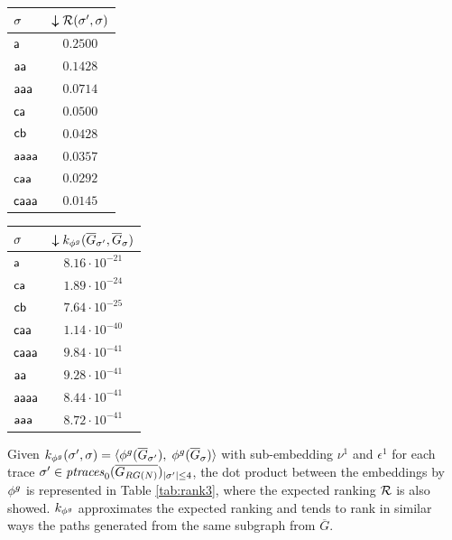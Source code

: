 \begin{table}[!t]
{\begin{tabular}{l|c}
	{$\trace$} &
	{$\boldsymbol{\downarrow}\goldenrank(\nonlogtrace,\logtrace)$} \\
	
	
	\midrule
	$\const{a}$  &  $0.2500$ \\
	$\const{aa}$  &  $0.1428$  \\
	$\const{aaa}$  & $0.0714$ \\
	$\const{ca}$  &   $0.0500$\\
	$\const{cb}$  & $0.0428$ \\
	$\const{aaaa}$  &  $0.0357$ \\
	$\const{caa}$  &  $0.0292$ \\
	$\const{caaa}$  &   $0.0145$ \\
	\bottomrule
\end{tabular}\quad	\begin{tabular}{l|c}
	\toprule
	
	{$\trace$} &
	{$\boldsymbol{\downarrow}k_{\gorgembed}(\closed{G}_\nonlogtrace,\closed{G}_{\logtrace})$} \\

	
	\midrule
	$\const{a}$  & $8.16\cdot 10^{-21}$ \\
	$\const{ca}$  &   $1.89\cdot 10^{-24}$\\
	$\const{cb}$  &   $7.64\cdot 10^{-25}$\\
	$\const{caa}$  &$1.14\cdot 10^{-40}$\\
	$\const{caaa}$  &  $9.84\cdot 10^{-41}$\\
	$\const{aa}$  &  $9.28\cdot 10^{-41}$ \\
	$\const{aaaa}$  & $8.44\cdot 10^{-41}$\\
	$\const{aaa}$  &  $8.72\cdot 10^{-41}$\\
	\bottomrule
\end{tabular}}
\end{table}




\begin{example}%
	Given $k_{\gorgembed}(\nonlogtrace,\logtrace)=\braket{\gorgembed(\overline{G}_\nonlogtrace),\;\gorgembed(\overline{G}_{\logtrace})}$ with sub-embedding $\nu^1$ and $\epsilon^1$ for each  trace $\nonlogtrace\in\WCal{0}{4}_{|\sigma'|\leq 4}$,  the dot product between the embeddings by $\gorgembed$ is represented in Table \ref{tab:rank3}, where the expected ranking $\goldenrank$ is also showed. $k_{\gorgembed}$ approximates the expected ranking  and tends to rank in similar ways the paths generated from the same subgraph from $\overline{G}$.
\end{example}


